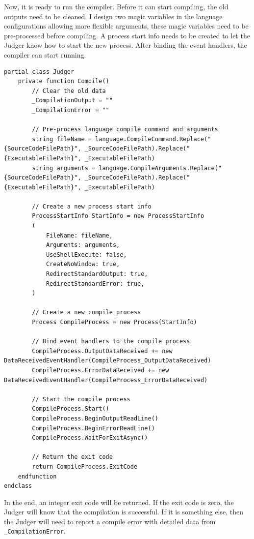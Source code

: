\documentclass[a4paper]{report}
\begin{document}
Now, it is ready to run the compiler. Before it can start compiling, the old outputs need to be cleaned. I design two magic variables in the language configurations allowing more flexible arguments, these magic variables need to be pre-processed before compiling. A process start info needs to be created to let the Judger know how to start the new process. After binding the event handlers, the compiler can start running.

\begin{verbatim}
partial class Judger
    private function Compile()
        // Clear the old data
        _CompilationOutput = ""
        _CompilationError = ""

        // Pre-process language compile command and arguments
        string fileName = language.CompileCommand.Replace("{SourceCodeFilePath}", _SourceCodeFilePath).Replace("{ExecutableFilePath}", _ExecutableFilePath)
        string arguments = language.CompileArguments.Replace("{SourceCodeFilePath}", _SourceCodeFilePath).Replace("{ExecutableFilePath}", _ExecutableFilePath)
        
        // Create a new process start info
        ProcessStartInfo StartInfo = new ProcessStartInfo
        (
            FileName: fileName,
            Arguments: arguments,
            UseShellExecute: false,
            CreateNoWindow: true,
            RedirectStandardOutput: true,
            RedirectStandardError: true,
        )
        
        // Create a new compile process
        Process CompileProcess = new Process(StartInfo)
        
        // Bind event handlers to the compile process
        CompileProcess.OutputDataReceived += new DataReceivedEventHandler(CompileProcess_OutputDataReceived)
        CompileProcess.ErrorDataReceived += new DataReceivedEventHandler(CompileProcess_ErrorDataReceived)
        
        // Start the compile process
        CompileProcess.Start()
        CompileProcess.BeginOutputReadLine()
        CompileProcess.BeginErrorReadLine()
        CompileProcess.WaitForExitAsync()

        // Return the exit code
        return CompileProcess.ExitCode
    endfunction
endclass
\end{verbatim}

In the end, an integer exit code will be returned. If the exit code is zero, the Judger will know that the compilation is successful. If it is something else, then the Judger will need to report a compile error with detailed data from \texttt{_CompilationError}. 
\end{document}
